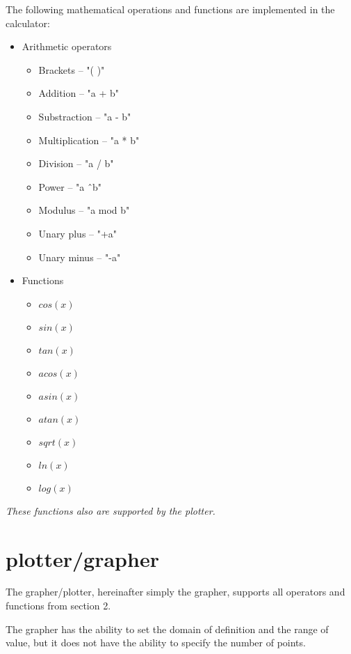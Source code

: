 \documentclass[12pt, a4paper]{article}
\begin{document}
The following mathematical operations and functions are implemented in the calculator:
  \begin{itemize}
    \item Arithmetic operators
    \begin{itemize}
      \item Brackets -- "( )"
      \item Addition -- "a + b"
      \item Substraction -- "a - b"
      \item Multiplication -- "a * b"
      \item Division -- "a / b"
      \item Power -- "a \^\ b"
      \item Modulus -- "a mod b"
      \item Unary plus -- "+a"
      \item Unary minus -- "-a"
    \end{itemize}
    \item Functions
    \begin{itemize}
      \item $cos(x)$
      \item $sin(x)$
      \item $tan(x)$
      \item $acos(x)$
      \item $asin(x)$
      \item $atan(x)$
      \item $sqrt(x)$
      \item $ln(x)$
      \item $log(x)$
    \end{itemize}
  \end{itemize}

\textit{These functions also are supported by the plotter.}

\pagebreak

\section{plotter/grapher}

The grapher/plotter, hereinafter simply the grapher, supports all operators and functions from section 2.

The grapher has the ability to set the domain of definition and the range of value, but it does not have the ability to specify the number of points.
\end{document}

